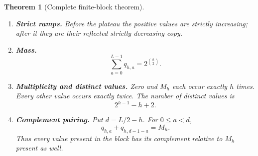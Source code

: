 \documentclass[11pt,oneside]{article}
\numberwithin{equation}{section}
\newtheorem{theorem}{Theorem}[section]
\theoremstyle{definition}
\theoremstyle{remark}
\begin{document}
\begin{theorem}[Complete finite-block theorem]
\begin{enumerate}
\item \textbf{Strict ramps.}  Before the plateau the positive values are
strictly increasing; after it they are their reflected strictly decreasing
copy.

\item \textbf{Mass.}
\begin{equation}
 \sum_{a=0}^{L-1}q_{h,a}=2^{\binom h2}.
 \label{p3:a:eq:general-mass}
\end{equation}

\item \textbf{Multiplicity and distinct values.}  Zero and \(M_h\) each
occur exactly \(h\) times.  Every other value occurs exactly twice.  The
number of distinct values is
\begin{equation}
 \boxed{2^{h-1}-h+2.}
 \label{p3:a:eq:general-distinct}
\end{equation}

\item \textbf{Complement pairing.}  Put \(d=L/2-h\).  For
\(0\le a<d\),
\begin{equation}
 \boxed{q_{h,a}+q_{h,d-1-a}=M_h.}
 \label{p3:a:eq:general-complement}
\end{equation}
Thus every value present in the block has its complement relative to \(M_h\)
present as well.
\end{enumerate}
\end{theorem}
\end{document}
